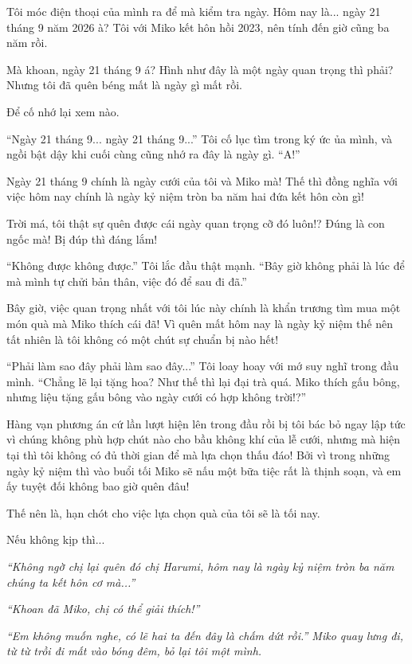 {Tôi móc điện thoại của mình ra để mà kiểm tra ngày. Hôm nay là... ngày
21 tháng 9 năm 2026 à? Tôi với Miko kết hôn hồi 2023, nên tính đến giờ
cũng ba năm rồi.

Mà khoan, ngày 21 tháng 9 á? Hình như đây là một ngày quan trọng thì
phải? Nhưng tôi đã quên béng mất là ngày gì mất rồi.

Để cố nhớ lại xem nào.

``Ngày 21 tháng 9... ngày 21 tháng 9...'' Tôi cố lục tìm trong ký ức ủa
mình, và ngồi bật dậy khi cuối cùng cũng nhớ ra đây là ngày gì. ``A!''

Ngày 21 tháng 9 chính là ngày cưới của tôi và Miko mà! Thế thì đồng
nghĩa với việc hôm nay chính là ngày kỷ niệm tròn ba năm hai đứa kết hôn
còn gì!

Trời má, tôi thật sự quên được cái ngày quan trọng cỡ đó luôn!? Đúng là
con ngốc mà! Bị đúp thì đáng lắm!

``Không được không được.'' Tôi lắc đầu thật mạnh. ``Bây giờ không phải
là lúc để mà mình tự chửi bản thân, việc đó để sau đi đã.''

Bây giờ, việc quan trọng nhất với tôi lúc này chính là khẩn trương tìm
mua một món quà mà Miko thích cái đã! Vì quên mất hôm nay là ngày kỷ
niệm thế nên tất nhiên là tôi không có một chút sự chuẩn bị nào hết!

``Phải làm sao đây phải làm sao đây...'' Tôi loay hoay với mớ suy nghĩ
trong đầu mình. ``Chẳng lẽ lại tặng hoa? Như thế thì lại đại trà quá.
Miko thích gấu bông, nhưng liệu tặng gấu bông vào ngày cưới có hợp không
trời!?''

Hàng vạn phương án cứ lần lượt hiện lên trong đầu rồi bị tôi bác bỏ ngay
lập tức vì chúng không phù hợp chút nào cho bầu không khí của lễ cưới,
nhưng mà hiện tại thì tôi không có đủ thời gian để mà lựa chọn thấu đáo!
Bởi vì trong những ngày kỷ niệm thì vào buổi tối Miko sẽ nấu một bữa
tiệc rất là thịnh soạn, và em ấy tuyệt đối không bao giờ quên đâu!

Thế nên là, hạn chót cho việc lựa chọn quà của tôi sẽ là tối nay.

Nếu không kịp thì...

\emph{``Không ngờ chị lại quên đó chị Harumi, hôm nay là ngày kỷ niệm
tròn ba năm chúng ta kết hôn cơ mà...''}

\emph{``Khoan đã Miko, chị có thể giải thích!''}

\emph{``Em không muốn nghe, có lẽ hai ta đến đây là chấm dứt rồi.'' Miko
quay lưng đi, từ từ trồi đi mất vào bóng đêm, bỏ lại tôi một mình.}

}
